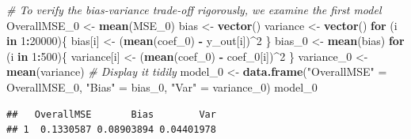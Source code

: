 \documentclass[]{article}
\newenvironment{Shaded}{\begin{snugshade}}{\end{snugshade}}
\newcommand{\KeywordTok}[1]{\textcolor[rgb]{0.13,0.29,0.53}{\textbf{#1}}}
\newcommand{\DecValTok}[1]{\textcolor[rgb]{0.00,0.00,0.81}{#1}}
\newcommand{\StringTok}[1]{\textcolor[rgb]{0.31,0.60,0.02}{#1}}
\newcommand{\CommentTok}[1]{\textcolor[rgb]{0.56,0.35,0.01}{\textit{#1}}}
\newcommand{\ControlFlowTok}[1]{\textcolor[rgb]{0.13,0.29,0.53}{\textbf{#1}}}
\newcommand{\OperatorTok}[1]{\textcolor[rgb]{0.81,0.36,0.00}{\textbf{#1}}}
\newcommand{\NormalTok}[1]{#1}
\begin{document}
\begin{Shaded}
\begin{Highlighting}[]
\CommentTok{# To verify the bias-variance trade-off rigorously, we examine the first model}
\NormalTok{OverallMSE_}\DecValTok{0}\NormalTok{ <-}\StringTok{ }\KeywordTok{mean}\NormalTok{(MSE_}\DecValTok{0}\NormalTok{)}
\NormalTok{bias <-}\StringTok{ }\KeywordTok{vector}\NormalTok{()}
\NormalTok{variance <-}\StringTok{ }\KeywordTok{vector}\NormalTok{()}
\ControlFlowTok{for}\NormalTok{ (i }\ControlFlowTok{in} \DecValTok{1}\OperatorTok{:}\DecValTok{20000}\NormalTok{)\{}
\NormalTok{  bias[i] <-}\StringTok{ }\NormalTok{(}\KeywordTok{mean}\NormalTok{(coef_}\DecValTok{0}\NormalTok{) }\OperatorTok{-}\StringTok{ }\NormalTok{y_out[i])}\OperatorTok{^}\DecValTok{2}
\NormalTok{\}}
\NormalTok{bias_}\DecValTok{0}\NormalTok{ <-}\StringTok{ }\KeywordTok{mean}\NormalTok{(bias)}
\ControlFlowTok{for}\NormalTok{ (i }\ControlFlowTok{in} \DecValTok{1}\OperatorTok{:}\DecValTok{500}\NormalTok{)\{}
\NormalTok{  variance[i] <-}\StringTok{ }\NormalTok{(}\KeywordTok{mean}\NormalTok{(coef_}\DecValTok{0}\NormalTok{) }\OperatorTok{-}\StringTok{ }\NormalTok{coef_}\DecValTok{0}\NormalTok{[i])}\OperatorTok{^}\DecValTok{2}
\NormalTok{\}}
\NormalTok{variance_}\DecValTok{0}\NormalTok{ <-}\StringTok{ }\KeywordTok{mean}\NormalTok{(variance)}
\CommentTok{# Display it tidily}
\NormalTok{model_}\DecValTok{0}\NormalTok{ <-}\StringTok{ }\KeywordTok{data.frame}\NormalTok{(}\StringTok{"OverallMSE"}\NormalTok{ =}\StringTok{ }\NormalTok{OverallMSE_}\DecValTok{0}\NormalTok{, }\StringTok{"Bias"}\NormalTok{ =}\StringTok{ }\NormalTok{bias_}\DecValTok{0}\NormalTok{, }\StringTok{"Var"}\NormalTok{ =}\StringTok{ }\NormalTok{variance_}\DecValTok{0}\NormalTok{)}
\NormalTok{model_}\DecValTok{0}
\end{Highlighting}
\end{Shaded}

\begin{verbatim}
##   OverallMSE       Bias        Var
## 1  0.1330587 0.08903894 0.04401978
\end{verbatim}

\begin{Shaded}
\end{Shaded}
\end{document}
